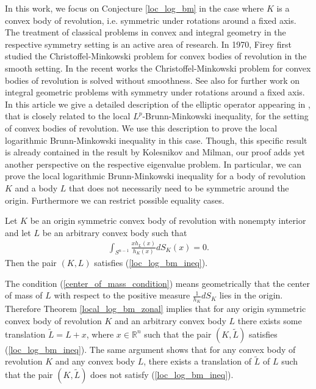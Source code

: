 \documentclass[12pt,twoside]{amsart}
\numberwithin{satz}{section}
\theoremstyle{definition}
\newenvironment{manualtheorem}[1]{%
	\renewcommand\themanualtheoreminner{#1}%
	\manualtheoreminner
}{\endmanualtheoreminner}
\numberwithin{equation}{section}
\newcommand\R{\mathbb{R}}
\begin{document}
	In this work, we focus on Conjecture \ref{loc_log_bm} in the case where $K$ is a convex body of revolution, i.e. symmetric under rotations around a fixed axis. The treatment of classical problems in convex and integral geometry in the respective symmetry setting is an active area of research. In 1970, Firey first studied the Christoffel-Minkowski problem for convex bodies of revolution \cite{firey2} in the smooth setting. In the recent works \cite{braunerhofstaetterortegamoreno2, mussnigulivelli} the Christoffel-Minkowski problem for convex bodies of revolution is solved without smoothness. See also \cite{braunerhofstaetterortegamoreno, colesantimussnigludwig, hugmussnigulivelli, knoerr} for further work on integral geometric problems with symmetry under rotations around a fixed axis. In this article we give a detailed description of the elliptic operator appearing in \cite{kolesnikovmilman, vanhandel}, that is closely related to the local $L^p$-Brunn-Minkowski inequality, for the setting of convex bodies of revolution. We use this description to prove the local logarithmic Brunn-Minkowski inequality in this case. Though, this specific result is already contained in the result by Kolesnikov and Milman, our proof adds yet another perspective on the respective eigenvalue problem. In particular, we can prove the local logarithmic Brunn-Minkowski inequality for a body of revolution $K$ and a body $L$ that does not necessarily need to be symmetric around the origin. Furthermore we can restrict possible equality cases. 
	
	\begin{manualtheorem}{A}\label{local_log_bm_zonal}
		Let $K$ be an origin symmetric convex body of revolution with nonempty interior and let $L$ be an arbitrary convex body such that
		\begin{align}\label{center_of_mass_condition}
			\int_{S^{n-1}}\frac{xh_L(x)}{h_K(x)}dS_K(x)=0.
		\end{align}
		Then the pair $(K,L)$ satisfies (\ref{loc_log_bm_ineq}).
	\end{manualtheorem}
	
	The condition (\ref{center_of_mass_condition}) means geometrically that the center of mass of $L$ with respect to the positive measure $\frac{1}{h_K}dS_K$ lies in the origin. Therefore Theorem \ref{local_log_bm_zonal} implies that for any origin symmetric convex body of revolution $K$ and an arbitrary convex body $L$ there exists some translation $\tilde{L}=L+x$, where $x\in\R^n$ such that the pair $(K,\tilde{L})$ satisfies (\ref{loc_log_bm_ineq}). The same argument shows that for any convex body of revolution $K$ and any convex body $L$, there exists a translation of $\tilde{L}$ of $L$ such that the pair $(K,\tilde{L})$ does not satisfy (\ref{loc_log_bm_ineq}). 
	
\end{document}
